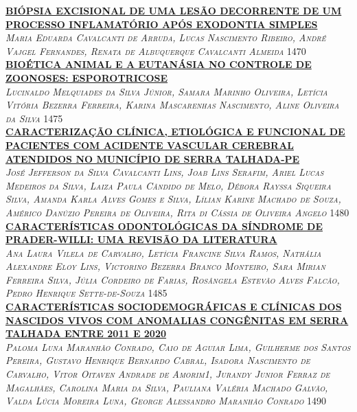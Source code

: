 \noindent \textsc{\hyperlink{trabalhos/250190.pdf.1}{\textbf{BIÓPSIA EXCISIONAL DE UMA LESÃO DECORRENTE DE UM PROCESSO INFLAMATÓRIO APÓS EXODONTIA SIMPLES}}}\\ 
\noindent \textsc{\textit{Maria Eduarda Cavalcanti de Arruda, Lucas Nascimento Ribeiro, André Vajgel Fernandes, Renata de Albuquerque Cavalcanti Almeida}} \hfill 1470\\ 

\noindent \textsc{\hyperlink{trabalhos/251436.pdf.1}{\textbf{BIOÉTICA ANIMAL E A EUTANÁSIA NO CONTROLE DE ZOONOSES: ESPOROTRICOSE}}}\\ 
\noindent \textsc{\textit{Lucinaldo Melquiades da Silva Júnior, Samara Marinho Oliveira, Letícia Vitória Bezerra Ferreira, Karina Mascarenhas Nascimento, Aline Oliveira da Silva}} \hfill 1475\\ 

\noindent \textsc{\hyperlink{trabalhos/251546.pdf.1}{\textbf{CARACTERIZAÇÃO CLÍNICA, ETIOLÓGICA E FUNCIONAL DE PACIENTES COM ACIDENTE VASCULAR CEREBRAL ATENDIDOS NO MUNICÍPIO DE SERRA TALHADA-PE}}}\\ 
\noindent \textsc{\textit{José Jefferson da Silva Cavalcanti Lins, Joab Lins Serafim, Ariel Lucas Medeiros da Silva, Laiza Paula Cândido de Melo, Débora Rayssa Siqueira Silva, Amanda Karla Alves Gomes e Silva, Lílian Karine Machado de Souza, Américo Danúzio Pereira de Oliveira, Rita di Cássia de Oliveira Angelo}} \hfill 1480\\ 

\noindent \textsc{\hyperlink{trabalhos/251067.pdf.1}{\textbf{CARACTERÍSTICAS ODONTOLÓGICAS DA SÍNDROME DE PRADER-WILLI: UMA REVISÃO DA LITERATURA}}}\\ 
\noindent \textsc{\textit{Ana Laura Vilela de Carvalho, Letícia Francine Silva Ramos, Nathália Alexandre Eloy Lins, Victorino Bezerra Branco Monteiro, Sara Mirian Ferreira Silva, Júlia Cordeiro de Farias, Rosângela Estevão Alves Falcão, Pedro Henrique Sette-de-Souza}} \hfill 1485\\ 

\noindent \textsc{\hyperlink{trabalhos/251801.pdf.1}{\textbf{CARACTERÍSTICAS SOCIODEMOGRÁFICAS E CLÍNICAS DOS NASCIDOS VIVOS COM ANOMALIAS CONGÊNITAS EM SERRA TALHADA ENTRE 2011 E 2020}}}\\ 
\noindent \textsc{\textit{Paloma Luna Maranhão Conrado, Caio de Aguiar Lima, Guilherme dos Santos Pereira, Gustavo Henrique Bernardo Cabral, Isadora Nascimento de Carvalho, Vitor Oitaven Andrade de Amorim1, Jurandy Junior Ferraz de Magalhães, Carolina Maria da Silva, Pauliana Valéria Machado Galvão, Valda Lúcia Moreira Luna, George Alessandro Maranhão Conrado}} \hfill 1490\\ 

